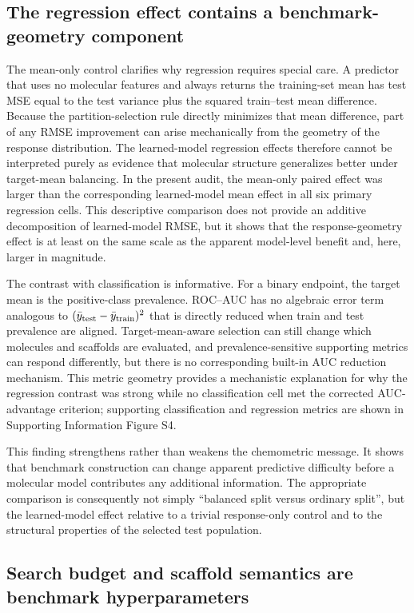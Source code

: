 \subsection{The regression effect contains a benchmark-geometry component}

The mean-only control clarifies why regression requires special care. A predictor that uses no molecular features and always returns the training-set mean has test MSE equal to the test variance plus the squared train--test mean difference. Because the partition-selection rule directly minimizes that mean difference, part of any RMSE improvement can arise mechanically from the geometry of the response distribution. The learned-model regression effects therefore cannot be interpreted purely as evidence that molecular structure generalizes better under target-mean balancing. In the present audit, the mean-only paired effect was larger than the corresponding learned-model mean effect in all six primary regression cells. This descriptive comparison does not provide an additive decomposition of learned-model RMSE, but it shows that the response-geometry effect is at least on the same scale as the apparent model-level benefit and, here, larger in magnitude.

The contrast with classification is informative. For a binary endpoint, the target mean is the positive-class prevalence. ROC--AUC has no algebraic error term analogous to $(\bar y_{\rm test}-\bar y_{\rm train})^2$ that is directly reduced when train and test prevalence are aligned. Target-mean-aware selection can still change which molecules and scaffolds are evaluated, and prevalence-sensitive supporting metrics can respond differently, but there is no corresponding built-in AUC reduction mechanism. This metric geometry provides a mechanistic explanation for why the regression contrast was strong while no classification cell met the corrected AUC-advantage criterion; supporting classification and regression metrics are shown in Supporting Information Figure S4.

This finding strengthens rather than weakens the chemometric message. It shows that benchmark construction can change apparent predictive difficulty before a molecular model contributes any additional information. The appropriate comparison is consequently not simply ``balanced split versus ordinary split'', but the learned-model effect relative to a trivial response-only control and to the structural properties of the selected test population.

\subsection{Search budget and scaffold semantics are benchmark hyperparameters}


